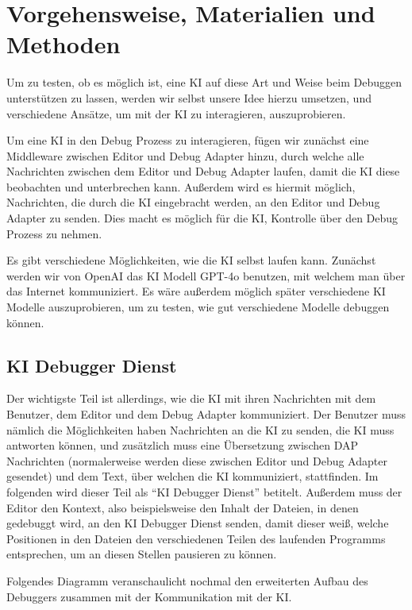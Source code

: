 \documentclass[a4paper,12pt,ngerman]{scrartcl}
\begin{document}
\section{Vorgehensweise, Materialien und Methoden}

Um zu testen, ob es möglich ist, eine KI auf diese Art und Weise beim Debuggen unterstützen zu lassen, werden wir selbst unsere Idee hierzu umsetzen, und verschiedene Ansätze, um mit der KI zu interagieren, auszuprobieren.

Um eine KI in den Debug Prozess zu interagieren, fügen wir zunächst eine Middleware zwischen Editor und Debug Adapter hinzu, durch welche alle Nachrichten zwischen dem Editor und Debug Adapter laufen, damit die KI diese beobachten und unterbrechen kann. Außerdem wird es hiermit möglich, Nachrichten, die durch die KI eingebracht werden, an den Editor und Debug Adapter zu senden. Dies macht es möglich für die KI, Kontrolle über den Debug Prozess zu nehmen.

Es gibt verschiedene Möglichkeiten, wie die KI selbst laufen kann. Zunächst werden wir von OpenAI das KI Modell GPT-4o benutzen, mit welchem man über das Internet kommuniziert. Es wäre außerdem möglich später verschiedene KI Modelle auszuprobieren, um zu testen, wie gut verschiedene Modelle debuggen können.

\subsection{KI Debugger Dienst}

Der wichtigste Teil ist allerdings, wie die KI mit ihren Nachrichten mit dem Benutzer, dem Editor und dem Debug Adapter kommuniziert. Der Benutzer muss nämlich die Möglichkeiten haben Nachrichten an die KI zu senden, die KI muss antworten können, und zusätzlich muss eine Übersetzung zwischen DAP Nachrichten (normalerweise werden diese zwischen Editor und Debug Adapter gesendet) und dem Text, über welchen die KI kommuniziert, stattfinden. Im folgenden wird dieser Teil als ``KI Debugger Dienst'' betitelt. Außerdem muss der Editor den Kontext, also beispielsweise den Inhalt der Dateien, in denen gedebuggt wird, an den KI Debugger Dienst senden, damit dieser weiß, welche Positionen in den Dateien den verschiedenen Teilen des laufenden Programms entsprechen, um an diesen Stellen pausieren zu können.

Folgendes Diagramm veranschaulicht nochmal den erweiterten Aufbau des Debuggers zusammen mit der Kommunikation mit der KI.
\end{document}
